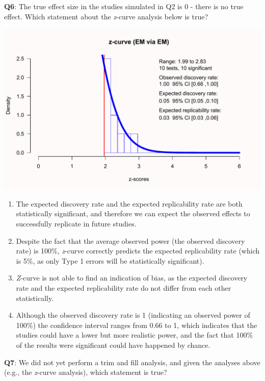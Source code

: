 \documentclass[
  oneside]{krantz}
\providecommand{\tightlist}{%
  \setlength{\itemsep}{0pt}\setlength{\parskip}{0pt}}
\begin{document}
\textbf{Q6}: The true effect size in the studies simulated in Q2 is 0 - there is no true effect. Which statement about the \emph{z}-curve analysis below is true?

\begin{center}\includegraphics[width=1\linewidth]{12-bias_files/figure-latex/zcurveq6-1} \end{center}

\begin{enumerate}
\def\labelenumi{\Alph{enumi})}
\tightlist
\item
  The expected discovery rate and the expected replicability rate are both statistically significant, and therefore we can expect the observed effects to successfully replicate in future studies.
\item
  Despite the fact that the average observed power (the observed discovery rate) is 100\%, \emph{z}-curve correctly predicts the expected replicability rate (which is 5\%, as only Type 1 errors will be statistically significant).
\item
  \emph{Z}-curve is not able to find an indication of bias, as the expected discovery rate and the expected replicability rate do not differ from each other statistically.
\item
  Although the observed discovery rate is 1 (indicating an observed power of 100\%) the confidence interval ranges from 0.66 to 1, which indicates that the studies could have a lower but more realistic power, and the fact that 100\% of the results were significant could have happened by chance.
\end{enumerate}

\textbf{Q7}: We did not yet perform a trim and fill analysis, and given the analyses above (e.g., the \emph{z}-curve analysis), which statement is true?
\end{document}
